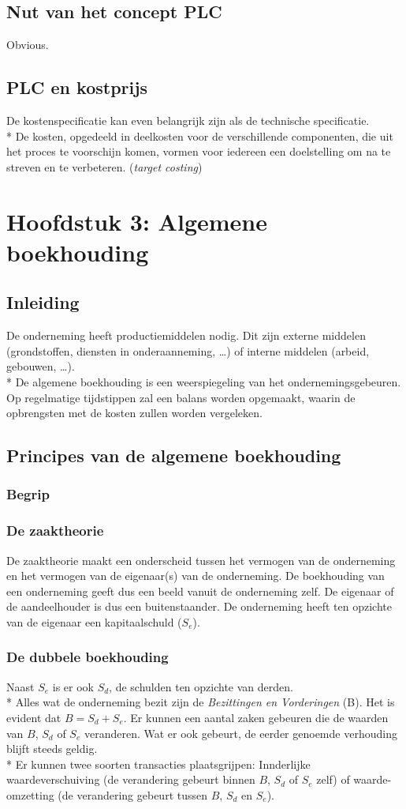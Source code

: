 \documentclass[12pt]{article}
\begin{document}
\subsection{Nut van het concept PLC}
Obvious.
\subsection{PLC en kostprijs}
De kostenspecificatie kan even belangrijk zijn als de technische specificatie.\\*
De kosten, opgedeeld in deelkosten voor de verschillende componenten, die uit het proces te voorschijn komen, vormen voor iedereen een doelstelling om na te streven en te verbeteren. (\textit{target costing})
\clearpage
\section{Hoofdstuk 3: Algemene boekhouding}
\subsection{Inleiding}
De onderneming heeft productiemiddelen nodig. Dit zijn externe middelen (grondstoffen, diensten in onderaanneming, \dots) of interne middelen (arbeid, gebouwen, \dots).\\*
De algemene boekhouding is een weerspiegeling van het ondernemingsgebeuren. Op regelmatige tijdstippen zal een balans worden opgemaakt, waarin de opbrengsten met de kosten zullen worden vergeleken.
\subsection{Principes van de algemene boekhouding}
\subsubsection{Begrip}
\subsubsection{De zaaktheorie}
De zaaktheorie maakt een onderscheid tussen het vermogen van de onderneming en het vermogen van de eigenaar(s) van de onderneming. De boekhouding van een onderneming geeft dus een beeld vanuit de onderneming zelf. De eigenaar of de aandeelhouder is dus een buitenstaander. De onderneming heeft ten opzichte van de eigenaar een kapitaalschuld ($S_e$).
\subsubsection{De dubbele boekhouding}
Naast $S_e$ is er ook $S_d$, de schulden ten opzichte van derden.\\*
Alles wat de onderneming bezit zijn de \textit{Bezittingen en Vorderingen} (B). Het is evident dat $B = S_d + S_e$. Er kunnen een aantal zaken gebeuren die de waarden van $B$, $S_d$ of $S_e$ veranderen. Wat er ook gebeurt, de eerder genoemde verhouding blijft steeds geldig.\\*
Er kunnen twee soorten transacties plaatsgrijpen: Innderlijke waardeverschuiving (de verandering gebeurt binnen $B$, $S_d$ of $S_e$ zelf) of waarde-omzetting (de verandering gebeurt tussen $B$, $S_d$ en $S_e$).
\end{document}
